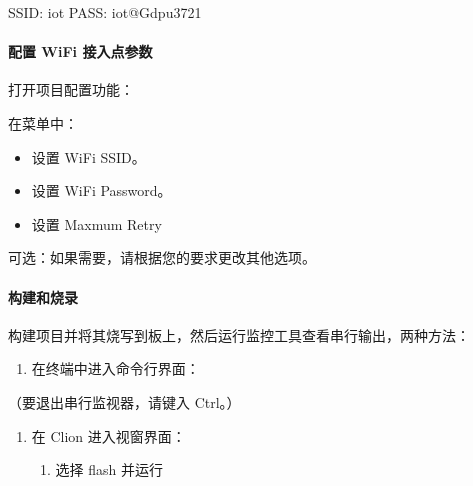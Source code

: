 \documentclass[a4paper,12pt,english]{sphinxmanual}
\begin{document}
{{\begin{sphinxVerbatim}[commandchars=\\\{\}]
SSID:	iot
PASS: iot@Gdpu3721
\end{sphinxVerbatim}


\paragraph{配置 WiFi 接入点参数}
\label{\detokenize{exp-esp32/wifi/station:id3}}
\sphinxAtStartPar
打开项目配置功能：

\sphinxAtStartPar
在菜单中：
\begin{itemize}
\item {} 
\sphinxAtStartPar
设置 WiFi SSID。

\item {} 
\sphinxAtStartPar
设置 WiFi Password。

\item {} 
\sphinxAtStartPar
设置 Maxmum Retry

\end{itemize}

\sphinxAtStartPar
可选：如果需要，请根据您的要求更改其他选项。


\paragraph{构建和烧录}
\label{\detokenize{exp-esp32/wifi/station:id4}}
\sphinxAtStartPar
构建项目并将其烧写到板上，然后运行监控工具查看串行输出，两种方法：
\begin{enumerate}
%
\item {} 
\sphinxAtStartPar
在终端中进入命令行界面：

\end{enumerate}

\sphinxAtStartPar
{} （要退出串行监视器，请键入 Ctrl\sphinxhyphen{}{]}。）
\begin{enumerate}
%
\setcounter{enumi}{1}
\item {} 
\sphinxAtStartPar
在 Clion 进入视窗界面：
\begin{enumerate}
%
\item {} 
\sphinxAtStartPar
选择 flash 并运行


\end{enumerate}
\end{enumerate}}}
\end{document}
